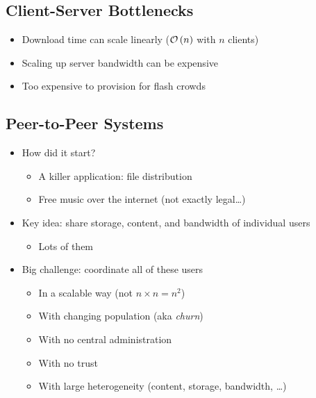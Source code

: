 \subsection{Client-Server Bottlenecks}
\begin{itemize}[nosep]
    \item Download time can scale linearly ($\mathcal{O}\left(n\right)$ with $n$ clients)
    \item Scaling up server bandwidth can be expensive
    \item Too expensive to provision for flash crowds
\end{itemize}
\subsection{Peer-to-Peer Systems}
\begin{itemize}[nosep]
    \item How did it start?
          \begin{itemize}[nosep]
              \item A killer application: file distribution
              \item Free music over the internet (not exactly legal\dots)
          \end{itemize}
    \item Key idea: share storage, content, and bandwidth of individual users
          \begin{itemize}[nosep]
              \item Lots of them
          \end{itemize}
    \item Big challenge: coordinate all of these users
          \begin{itemize}[nosep]
              \item In a scalable way (not $n\times n=n^2$)
              \item With changing population (aka \emph{churn})
              \item With no central administration
              \item With no trust
              \item With large heterogeneity (content, storage, bandwidth, \dots)
          \end{itemize}
\end{itemize}
